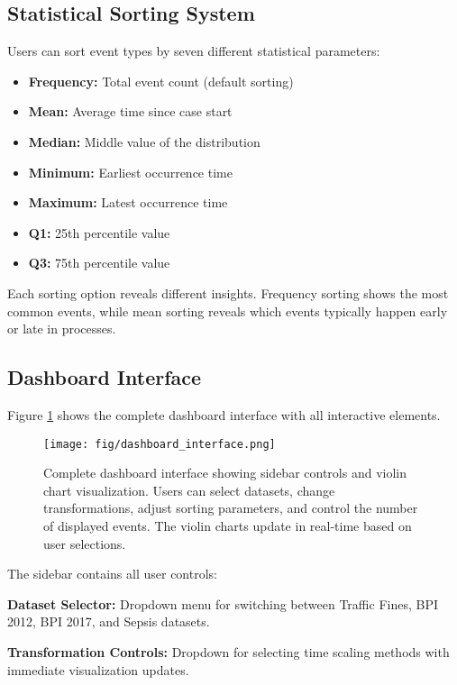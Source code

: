 \subsection{Statistical Sorting System}
\label{subsec:sorting}

Users can sort event types by seven different statistical parameters:

\begin{itemize}
    \item \textbf{Frequency:} Total event count (default sorting)
    \item \textbf{Mean:} Average time since case start
    \item \textbf{Median:} Middle value of the distribution
    \item \textbf{Minimum:} Earliest occurrence time
    \item \textbf{Maximum:} Latest occurrence time
    \item \textbf{Q1:} 25th percentile value
    \item \textbf{Q3:} 75th percentile value
\end{itemize}

Each sorting option reveals different insights. Frequency sorting shows the most common events, while mean sorting reveals which events typically happen early or late in processes.

\subsection{Dashboard Interface}
\label{subsec:interface}

Figure \ref{fig:dashboard_interface} shows the complete dashboard interface with all interactive elements.

\begin{figure}[H]
\centering
\texttt{[image: fig/dashboard\_interface.png]}
\caption{Complete dashboard interface showing sidebar controls and violin chart visualization. Users can select datasets, change transformations, adjust sorting parameters, and control the number of displayed events. The violin charts update in real-time based on user selections.}
\label{fig:dashboard_interface}
\end{figure}

The sidebar contains all user controls:

\textbf{Dataset Selector:} Dropdown menu for switching between Traffic Fines, BPI 2012, BPI 2017, and Sepsis datasets.

\textbf{Transformation Controls:} Dropdown for selecting time scaling methods with immediate visualization updates.

